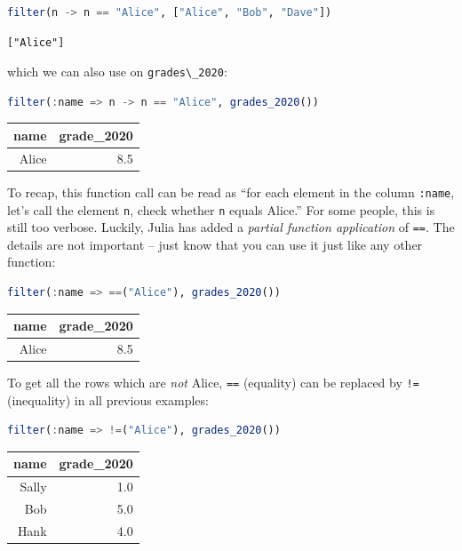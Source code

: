 \documentclass[
  notoc %
]{tufte-book}
\newcommand{\passthrough}[1]{#1}
\begin{document}
\begin{lstlisting}[language=Julia]
filter(n -> n == "Alice", ["Alice", "Bob", "Dave"])
\end{lstlisting}

\begin{lstlisting}[language=Output]
["Alice"]
\end{lstlisting}

which we can also use on \passthrough{\lstinline!grades\_2020!}:

\begin{lstlisting}[language=Julia]
filter(:name => n -> n == "Alice", grades_2020())
\end{lstlisting}

\begin{longtable}[]{@{}rr@{}}
\toprule
name & grade\_2020 \\
\midrule
\endhead
Alice & 8.5 \\
\bottomrule
\end{longtable}

To recap, this function call can be read as ``for each element in the
column \passthrough{\lstinline!:name!}, let's call the element
\passthrough{\lstinline!n!}, check whether \passthrough{\lstinline!n!}
equals Alice.'' For some people, this is still too verbose. Luckily,
Julia has added a \emph{partial function application} of
\passthrough{\lstinline!==!}. The details are not important -- just know
that you can use it just like any other function:

\begin{lstlisting}[language=Julia]
filter(:name => ==("Alice"), grades_2020())
\end{lstlisting}

\begin{longtable}[]{@{}rr@{}}
\toprule
name & grade\_2020 \\
\midrule
\endhead
Alice & 8.5 \\
\bottomrule
\end{longtable}

To get all the rows which are \emph{not} Alice,
\passthrough{\lstinline!==!} (equality) can be replaced by
\passthrough{\lstinline"!="} (inequality) in all previous examples:

\begin{lstlisting}[language=Julia]
filter(:name => !=("Alice"), grades_2020())
\end{lstlisting}

\begin{longtable}[]{@{}rr@{}}
\toprule
name & grade\_2020 \\
\midrule
\endhead
Sally & 1.0 \\
Bob & 5.0 \\
Hank & 4.0 \\
\bottomrule
\end{longtable}
\end{document}
